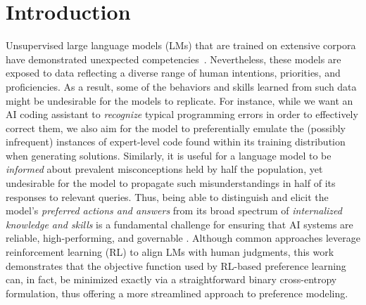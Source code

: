 \section{Introduction}
Unsupervised large language models (LMs) that are trained on extensive corpora have demonstrated unexpected competencies~\citep{chowdhery2022palm, brown2020language, touvron2023llama, bubeck2023sparks}. Nevertheless, these models are exposed to data reflecting a diverse range of human intentions, priorities, and proficiencies. As a result, some of the behaviors and skills learned from such data might be undesirable for the models to replicate. For instance, while we want an AI coding assistant to \textit{recognize} typical programming errors in order to effectively correct them, we also aim for the model to preferentially emulate the (possibly infrequent) instances of expert-level code found within its training distribution when generating solutions. Similarly, it is useful for a language model to be \textit{informed} about prevalent misconceptions held by half the population, yet undesirable for the model to propagate such misunderstandings in half of its responses to relevant queries. Thus, being able to distinguish and elicit the model’s \emph{preferred actions and answers} from its broad spectrum of \textit{internalized knowledge and skills} is a fundamental challenge for ensuring that AI systems are reliable, high-performing, and governable \citep{ouyang2022training}. Although common approaches leverage reinforcement learning (RL) to align LMs with human judgments, this work demonstrates that the objective function used by RL-based preference learning can, in fact, be minimized exactly via a straightforward binary cross-entropy formulation, thus offering a more streamlined approach to preference modeling.

